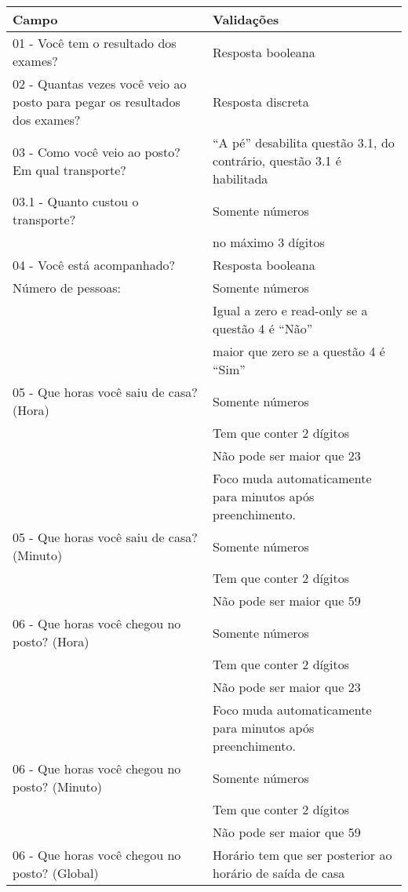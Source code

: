 \begin{longtable}{p{}|p{}}

Campo & Validações \\ \hline

01 - Você tem o resultado dos exames? & Resposta booleana \\ \hline

02 - Quantas vezes você veio ao posto para pegar os resultados dos exames? & Resposta discreta \\ \hline

03 - Como você veio ao posto? Em qual transporte?  & ``A pé'' desabilita questão 3.1, do contrário, questão 3.1 é habilitada \\ \hline

03.1 - Quanto custou o transporte? & Somente números \\ \cline{2-2} & no máximo 3 dígitos \\ \hline

04 - Você está acompanhado? & Resposta booleana \\ \hline
Número de pessoas: & Somente números \\ \cline{2-2} & Igual a zero e read-only se a questão 4 é ``Não'' \\ \cline{2-2} & maior que zero se a questão 4 é ``Sim'' \\ \hline

05 - Que horas você saiu de casa? (Hora) & Somente números \\ \cline{2-2}  & Tem que conter 2 dígitos \\ \cline{2-2} & Não pode ser maior que 23 \\ \cline{2-2} & Foco muda automaticamente para minutos após preenchimento.  \\ \hline
05 - Que horas você saiu de casa? (Minuto) & Somente números \\ \cline{2-2}  & Tem que conter 2 dígitos \\ \cline{2-2} & Não pode ser maior que 59 \\ \hline

06 - Que horas você chegou no posto? (Hora) & Somente números \\ \cline{2-2}  & Tem que conter 2 dígitos \\ \cline{2-2} & Não pode ser maior que 23 \\ \cline{2-2} & Foco muda automaticamente para minutos após preenchimento.  \\ \hline
06 - Que horas você chegou no posto? (Minuto) & Somente números \\ \cline{2-2}  & Tem que conter 2 dígitos \\ \cline{2-2} & Não pode ser maior que 59 \\ \hline
06 - Que horas você chegou no posto? (Global) & Horário tem que ser posterior ao horário de saída de casa \\ \hline


\end{longtable}
